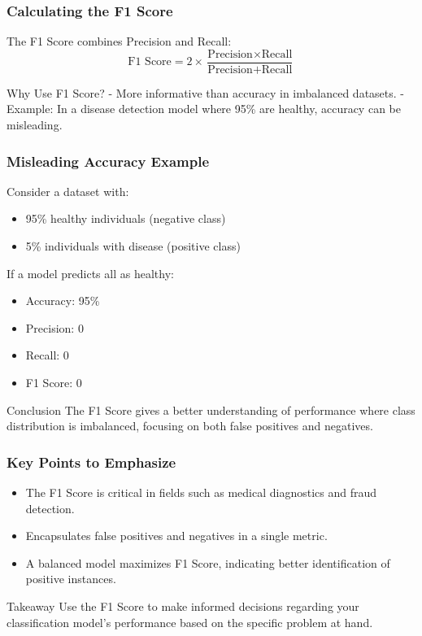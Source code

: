 \documentclass[aspectratio=169]{beamer}
\begin{document}
\begin{frame}[fragile]
    \frametitle{Calculating the F1 Score}
    The F1 Score combines Precision and Recall:
    \begin{equation}
        \text{F1 Score} = 2 \times \frac{\text{Precision} \times \text{Recall}}{\text{Precision} + \text{Recall}}
    \end{equation}
    \begin{block}{Why Use F1 Score?}
        - More informative than accuracy in imbalanced datasets.
        - Example: In a disease detection model where 95\% are healthy, accuracy can be misleading.
    \end{block}
\end{frame}

\begin{frame}[fragile]
    \frametitle{Misleading Accuracy Example}
    Consider a dataset with:
    \begin{itemize}
        \item 95\% healthy individuals (negative class)
        \item 5\% individuals with disease (positive class)
    \end{itemize}
    If a model predicts all as healthy:
    \begin{itemize}
        \item Accuracy: 95\%
        \item Precision: 0
        \item Recall: 0
        \item F1 Score: 0
    \end{itemize}
    \begin{block}{Conclusion}
        The F1 Score gives a better understanding of performance where class distribution is imbalanced, focusing on both false positives and negatives.
    \end{block}
\end{frame}

\begin{frame}[fragile]
    \frametitle{Key Points to Emphasize}
    \begin{itemize}
        \item The F1 Score is critical in fields such as medical diagnostics and fraud detection.
        \item Encapsulates false positives and negatives in a single metric.
        \item A balanced model maximizes F1 Score, indicating better identification of positive instances.
    \end{itemize}
    \begin{block}{Takeaway}
        Use the F1 Score to make informed decisions regarding your classification model's performance based on the specific problem at hand.
    \end{block}
\end{frame}
\end{document}

